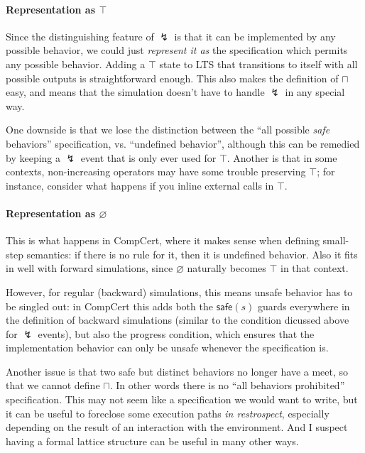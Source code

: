 \documentclass[11pt]{article}
\begin{document}
\paragraph{Representation as $\top$}

Since the distinguishing feature of $\lightning$ is that
it can be implemented by any possible behavior,
we could just \emph{represent it as}
the specification which permits any possible behavior.
Adding a $\top$ state to LTS that transitions to itself
with all possible outputs is straightforward enough.
This also makes the definition of $\sqcap$ easy,
and means that the simulation doesn't have to handle $\lightning$
in any special way.

One downside is that we lose the distinction between
the ``all possible \emph{safe} behaviors'' specification,
vs. ``undefined behavior'',
although this can be remedied by keeping a $\lightning$ event
that is only ever used for $\top$.
Another is that in some contexts,
non-increasing operators 
may have some trouble preserving $\top$;
for instance, consider what happens if you
inline external calls in $\top$.

\paragraph{Representation as $\varnothing$}

This is what happens in CompCert,
where it makes sense when defining small-step semantics:
if there is no rule for it,
then it is undefined behavior.
Also it fits in well with forward simulations,
since $\varnothing$ naturally becomes $\top$ in that context.

However, for regular (backward) simulations,
this means unsafe behavior has to be singled out:
in CompCert this adds both the $\mathsf{safe}(s)$
guards everywhere in the definition of backward simulations
(similar to the condition dicussed above for $\lightning$ events),
but also the progress condition,
which ensures that the implementation behavior
can only be unsafe whenever the specification is.

Another issue is that
two safe but distinct behaviors no longer have a meet,
so that we cannot define $\sqcap$.
In other words there is no ``all behaviors prohibited'' specification.
This may not seem like a specification we would want to write,
but it can be useful to foreclose some execution paths \emph{in restrospect},
especially depending on the result of an interaction with the environment.
And I suspect having a formal lattice structure
can be useful in many other ways.
\end{document}
